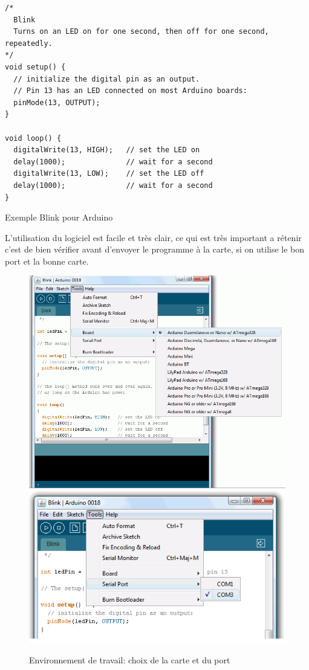 \begin{table}[h]
\begin{lstlisting}
/*
  Blink
  Turns on an LED on for one second, then off for one second, repeatedly.
*/
void setup() {                
  // initialize the digital pin as an output.
  // Pin 13 has an LED connected on most Arduino boards:
  pinMode(13, OUTPUT);     
}

void loop() {
  digitalWrite(13, HIGH);   // set the LED on
  delay(1000);              // wait for a second
  digitalWrite(13, LOW);    // set the LED off
  delay(1000);              // wait for a second
}
\end{lstlisting}
\caption{Exemple Blink pour Arduino}
\end{table}

L'utilisation du logiciel est facile et très clair, ce qui est très important a rétenir c'est de bien vérifier avant d'envoyer le programme à la carte,
si on utilise le bon port et la bonne carte.

\begin{figure}[h]
\begin{center}
 \includegraphics[scale=0.3]{figure/Arduino/logiciel.png}
\includegraphics[scale=0.5]{figure/Arduino/logiciel1.png}
\caption{Environnement de travail: choix de la carte et du port}
\end{center}
\end{figure}

